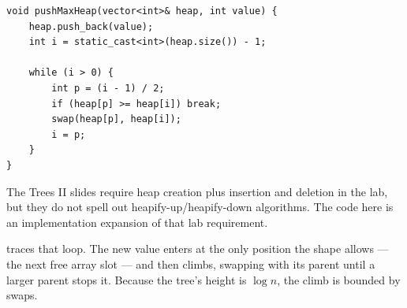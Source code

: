 \begin{lstlisting}
void pushMaxHeap(vector<int>& heap, int value) {
    heap.push_back(value);
    int i = static_cast<int>(heap.size()) - 1;

    while (i > 0) {
        int p = (i - 1) / 2;
        if (heap[p] >= heap[i]) break;
        swap(heap[p], heap[i]);
        i = p;
    }
}
\end{lstlisting}

\begin{clarification}
The Trees II slides require heap creation plus insertion and deletion in the lab, but they do not spell out heapify-up/heapify-down algorithms. The code here is an implementation expansion of that lab requirement.
\end{clarification}

 traces that loop. The new value enters at the only position the
shape allows --- the next free array slot --- and then climbs, swapping with its parent until
a larger parent stops it. Because the tree's height is $\log n$, the climb is bounded by
 swaps.

